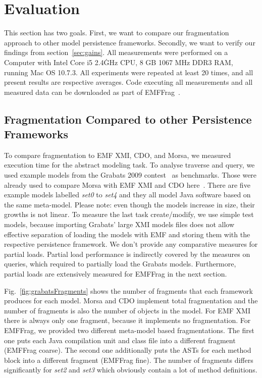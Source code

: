 \section{Evaluation}
\label{sec:evaluation}

This section has two goals. First, we want to compare our fragmentation approach to other model persistence frameworks. Secondly, we want to verify our findings from section~\ref{sec:gains}. 
All measurements were performed on a Computer with Intel Core i5 2.4\.GHz CPU, 8 GB 1067 MHz DDR3 RAM, running Mac OS 10.7.3. All experiments were repeated at least 20 times, and all present results are respective averages. Code executing all measurements and all measured data can be downloaded as part of EMFFrag~\cite{EMFFragProject}.

\subsection{Fragmentation Compared to other Persistence Frameworks}

To compare fragmentation to EMF XMI, CDO, and Morsa, we measured execution time for the abstract modeling task. To analyse traverse and query, we used example models from the Grabats 2009 contest~\cite{grabats} as benchmarks. Those were already used to compare Morsa with EMF XMI and CDO here~\cite{morsa2011}. There are five example models labelled \emph{set0} to \emph{set4} and they all model Java software based on the same meta-model. Please note: even though the models increase in size, their growths is not linear. To measure the last task create/modify, we use simple test models, because importing Grabats' large XMI models files does not allow effective separation of loading the models with EMF and storing them with the respective persistence framework. We don't provide any comparative measures for partial loads. Partial load performance is indirectly covered by the measures on queries, which required to partially load the Grabats models. Furthermore, partial loads are extensively measured for EMFFrag in the next section.

Fig.~\ref{fig:grabatsFragments} shows the number of fragments that each framework produces for each model. Morsa and CDO implement total fragmentation and the number of fragments is also the number of objects in the model. For EMF XMI there is always only one fragment, because it implements no fragmentation. For EMFFrag, we provided two different meta-model based fragmentations. The first one puts each Java compilation unit and class file into a different fragment (EMFFrag coarse). The second one additionally puts the ASTs for each method block into a different fragment (EMFFrag fine). The number of fragments differs significantly for \emph{set2} and \emph{set3} which obviously contain a lot of method definitions. 

